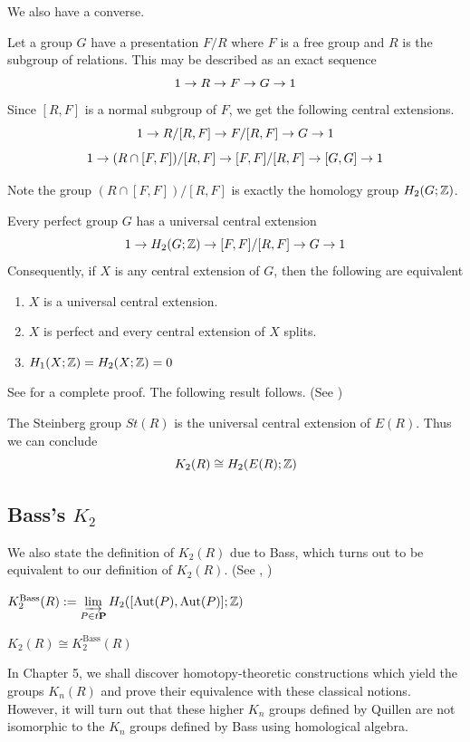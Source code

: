 We also have a converse. 

Let a group $G$ have a presentation $F/R$ where $F$ is a free group and $R$ is the subgroup of relations.
This may be described as an exact sequence
\[
1 \to R \to F \to G \to 1
\]
Since $[R,F]$ is a normal subgroup of $F$, we get the following central extensions.
\[
  1 \to R/[R,F] \to F/[R,F] \to G \to 1 \\
\]
\begin{equation}
  1 \to (R \cap [F,F])/[R,F] \to [F,F]/[R,F] \to [G,G] \to 1
  \label{eq:beforeH2}
\end{equation}

Note the group $(R \cap [F,F])/[R,F]$ is exactly the homology group $H_2(G;\mathbb{Z})$.

\begin{theorem}\label{thm:recog_universalcentral}
Every perfect group $G$ has a universal central extension
\[
1 \to H_2(G;\mathbb{Z}) \to [F,F]/[R,F] \to G \to 1
\]
Consequently, if $X$ is any central extension of $G$, then the following are equivalent
\begin{enumerate}
  \item $X$ is a universal central extension.
  \item $X$ is perfect and every central extension of $X$ splits.
  \item $H_1(X;\mathbb{Z}) = H_2(X;\mathbb{Z}) = 0$
\end{enumerate}
\end{theorem}
See \cite{Milnor} for a complete proof.
The following result follows. (See \cite{KervaireSteinberg})
\begin{theorem}
The Steinberg group $St(R)$ is the universal central extension of $E(R)$.
Thus we can conclude
\[
  K_2(R) \cong H_2(E(R);\mathbb{Z})
\]
\end{theorem}

\subsection{Bass's $K_2$}
We also state the definition of $K_2(R)$ due to Bass,
which turns out to be equivalent to our definition of $K_2(R)$. (See \cite{Bass}, \cite{Kervaire-Steinberg})

\begin{definition}[Bass's $K_2$]
$K^{\text{Bass}}_2(R) := \varinjlim\limits_{P \in t\mathbf P} H_2([\operatorname*{Aut}(P),\operatorname*{Aut}(P)];\mathbb{Z})$
\end{definition}

\begin{theorem}
 $K_2(R) \cong K_2^{\text{Bass}}(R)$ 
\end{theorem}

In Chapter 5, we shall discover homotopy-theoretic constructions
which yield the groups $K_n(R)$ and prove their equivalence with these classical notions.
However, it will turn out that these higher $K_n$ groups defined by Quillen are not 
isomorphic to the $K_n$ groups defined by Bass using homological algebra.


